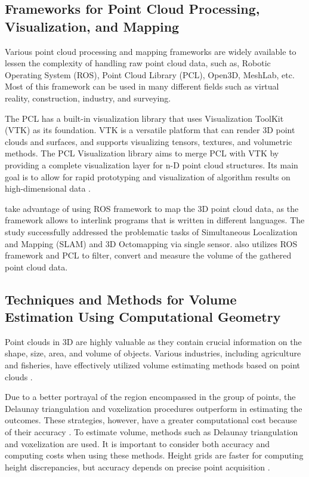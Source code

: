 \subsection{Frameworks for Point Cloud Processing, Visualization, and Mapping}
Various point cloud processing and mapping frameworks are widely available to lessen the complexity of handling raw point cloud data, such as, Robotic Operating System (ROS), Point Cloud Library (PCL), Open3D, MeshLab, etc. Most of this framework can be used in many different fields such as virtual reality, construction, industry, and surveying.

The PCL has a built-in visualization library that uses Visualization ToolKit (VTK) as its foundation. VTK is a versatile platform that can render 3D point clouds and surfaces, and supports visualizing tensors, textures, and volumetric methods. The PCL Visualization library aims to merge PCL with VTK by providing a complete visualization layer for n-D point cloud structures. Its main goal is to allow for rapid prototyping and visualization of algorithm results on high-dimensional data \citep{rusu2011}.

\citet{ocando2017} take advantage of using ROS framework to map the 3D point cloud data, as the framework allows to interlink programs that is written in different languages. The study successfully addressed the problematic tasks of Simultaneous Localization and Mapping (SLAM) and 3D Octomapping via single sensor. \citet{clar2022} also utilizes ROS framework and PCL to filter, convert and measure the volume of the gathered point cloud data.

\subsection{Techniques and Methods for Volume Estimation Using Computational Geometry}

Point clouds in 3D are highly valuable as they contain crucial information on the shape, size, area, and volume of objects. Various industries, including agriculture and fisheries, have effectively utilized volume estimating methods based on point clouds \citep{geuvara2020}.

Due to a better portrayal of the region encompassed in the group of points, the Delaunay triangulation and voxelization procedures outperform in estimating the outcomes. These strategies, however, have a greater computational cost because of their accuracy \citep{chee2015}. To estimate volume, methods such as Delaunay triangulation and voxelization are used. It is important to consider both accuracy and computing costs when using these methods. Height grids are faster for computing height discrepancies, but accuracy depends on precise point acquisition \citep{bewley2011, duff2000}.


